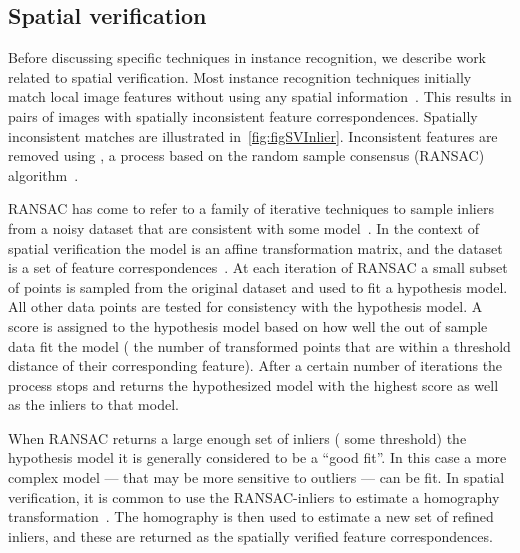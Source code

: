     \subsection{Spatial verification}\label{subsec:sverreview}
        Before discussing specific techniques in instance recognition, we describe work related to spatial
        verification. Most instance recognition techniques initially match local image features without using any
        spatial information~\cite{lowe_distinctive_2004, sivic_efficient_2009, philbin_object_2007,
        tolias_image_2015}. This results in pairs of images with spatially inconsistent feature correspondences.
        Spatially inconsistent matches are illustrated in~\cref{fig:figSVInlier}. Inconsistent features are removed
        using , a process based on the random sample consensus (RANSAC)
        algorithm~\cite{fischler_random_1981}.

        RANSAC has come to refer to a family of iterative techniques to sample inliers from a noisy dataset that
        are consistent with some model~\cite{fischler_random_1981, hartley_multiple_2003, chum_locally_2003,
        raguram_usac_2013}. In the context of spatial verification the model is an affine transformation matrix,
        and the dataset is a set of feature correspondences~\cite{lowe_distinctive_2004, sivic_video_2003,
        philbin_object_2007, chum_total_2011, arandjelovic_three_2012}. At each iteration of RANSAC a small subset
        of points is sampled from the original dataset and used to fit a hypothesis model. All other data points
        are tested for consistency with the hypothesis model. A score is assigned to the hypothesis model based on
        how well the out of sample data fit the model (\eg{} the number of transformed points that are within a
        threshold distance of their corresponding feature). After a certain number of iterations the process stops
        and returns the hypothesized model with the highest score as well as the inliers to that model.

        When RANSAC returns a large enough set of inliers (\wrt{} some threshold) the hypothesis model it is
        generally considered to be a ``good fit''. In this case a more complex model --- that may be more sensitive
        to outliers --- can be fit. In spatial verification, it is common to use the RANSAC-inliers to estimate a
        homography transformation~\cite[311--320]{szeliski_computer_2010}. The homography is then used to estimate
        a new set of refined inliers, and these are returned as the spatially verified feature correspondences.


